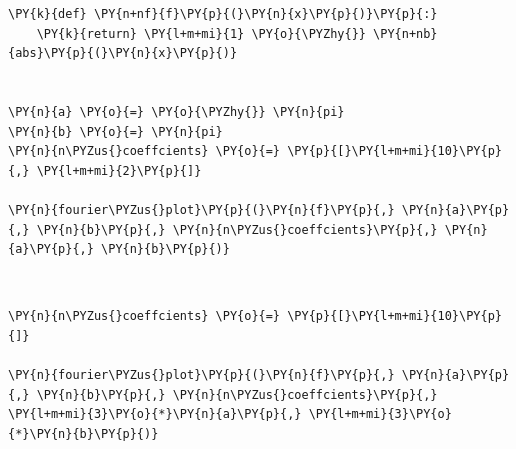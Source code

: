     \begin{tcolorbox}[breakable, size=fbox, boxrule=1pt, pad at break*=1mm,colback=cellbackground, colframe=cellborder]
\begin{Verbatim}[commandchars=\\\{\}]
\PY{k}{def} \PY{n+nf}{f}\PY{p}{(}\PY{n}{x}\PY{p}{)}\PY{p}{:}
    \PY{k}{return} \PY{l+m+mi}{1} \PY{o}{\PYZhy{}} \PY{n+nb}{abs}\PY{p}{(}\PY{n}{x}\PY{p}{)}


\PY{n}{a} \PY{o}{=} \PY{o}{\PYZhy{}} \PY{n}{pi}
\PY{n}{b} \PY{o}{=} \PY{n}{pi}
\PY{n}{n\PYZus{}coeffcients} \PY{o}{=} \PY{p}{[}\PY{l+m+mi}{10}\PY{p}{,} \PY{l+m+mi}{2}\PY{p}{]}

\PY{n}{fourier\PYZus{}plot}\PY{p}{(}\PY{n}{f}\PY{p}{,} \PY{n}{a}\PY{p}{,} \PY{n}{b}\PY{p}{,} \PY{n}{n\PYZus{}coeffcients}\PY{p}{,} \PY{n}{a}\PY{p}{,} \PY{n}{b}\PY{p}{)}
\end{Verbatim}
\end{tcolorbox}

    \begin{center}
    \end{center}
    { \hspace*{\fill} \\}
    
    \begin{tcolorbox}[breakable, size=fbox, boxrule=1pt, pad at break*=1mm,colback=cellbackground, colframe=cellborder]
\begin{Verbatim}[commandchars=\\\{\}]
\PY{n}{n\PYZus{}coeffcients} \PY{o}{=} \PY{p}{[}\PY{l+m+mi}{10}\PY{p}{]}

\PY{n}{fourier\PYZus{}plot}\PY{p}{(}\PY{n}{f}\PY{p}{,} \PY{n}{a}\PY{p}{,} \PY{n}{b}\PY{p}{,} \PY{n}{n\PYZus{}coeffcients}\PY{p}{,} \PY{l+m+mi}{3}\PY{o}{*}\PY{n}{a}\PY{p}{,} \PY{l+m+mi}{3}\PY{o}{*}\PY{n}{b}\PY{p}{)}
\end{Verbatim}
\end{tcolorbox}

    \begin{center}
    \end{center}
    { \hspace*{\fill} \\}
    
